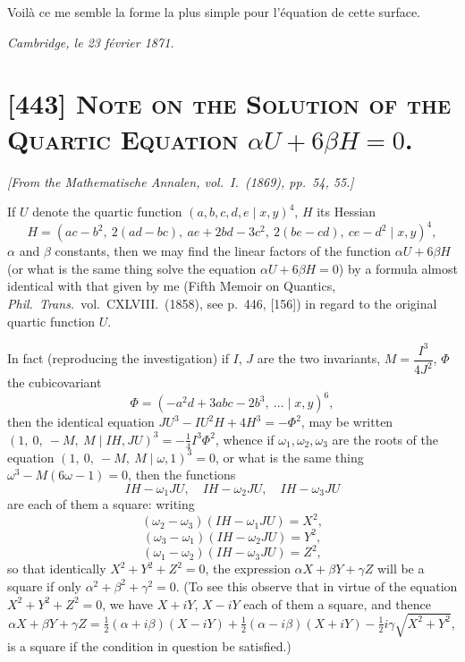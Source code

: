 \documentclass[11pt,a4paper]{article}
\begin{document}
Voil\`a ce me semble la forme la plus simple pour l'\'equation de cette surface.

\begin{flushright}
\textit{Cambridge, le 23 f\'evrier 1871.}
\end{flushright}

\bigskip

\section{[443] \textsc{Note on the Solution of the Quartic Equation} $\alpha U + 6\beta H = 0$.}

\begin{center}
\textit{[From the Mathematische Annalen, vol.\ I.\ (1869), pp.\ 54, 55.]}
\end{center}

\medskip

If $U$ denote the quartic function $(a, b, c, d, e \mid x, y)^4$, $H$ its Hessian
\[
H = (ac - b^2,\ 2(ad - bc),\ ae + 2bd - 3c^2,\ 2(be - cd),\ ce - d^2  \mid x, y)^4,
\]
$\alpha$ and $\beta$ constants, then we may find the linear factors of the function
$\alpha U + 6 \beta H$ (or what is the same thing solve the equation $\alpha U + 6 \beta H = 0$)
by a formula almost identical with that given by me (Fifth Memoir on Quantics, \textit{Phil.\
Trans.}\ vol.\ CXLVIII.\ (1858), see p.\ 446, [156]) in regard to the original quartic
function $U$.

\medskip

In fact (reproducing the investigation) if $I$, $J$ are the two invariants, $M = \dfrac{I^3}{4 J^2}$,
$\Phi$ the cubicovariant
\[
\Phi = (-a^2 d + 3 abc - 2b^3,\ \ldots  \mid x, y)^6,
\]
then the identical equation $J U^3 - I U^2 H + 4 H^3 = -\Phi^2$, may be written
$(1,\ 0,\ -M,\ M \mid IH, JU)^3 = -\tfrac{1}{4} I^3 \Phi^2$, whence if $\omega_1, \omega_2, \omega_3$
are the roots of the equation $(1,\ 0,\ -M,\ M \mid \omega, 1)^3 = 0$, or what is the same
thing $\omega^3 - M(6\omega - 1) = 0$, then the functions
\[
IH - \omega_1 JU,\quad IH - \omega_2 JU,\quad IH - \omega_3 JU
\]
are each of them a square: writing
\[
(\omega_2 - \omega_3)(IH - \omega_1 JU) = X^2,
\]
\[
(\omega_3 - \omega_1)(IH - \omega_2 JU) = Y^2,
\]
\[
(\omega_1 - \omega_2)(IH - \omega_3 JU) = Z^2,
\]
so that identically $X^2 + Y^2 + Z^2 = 0$, the expression $\alpha X + \beta Y + \gamma Z$
will be a square if only $\alpha^2 + \beta^2 + \gamma^2 = 0$. (To see this observe that in
virtue of the equation $X^2 + Y^2 + Z^2 = 0$, we have $X + iY$, $X - iY$ each of them a
square, and thence
\[
\alpha X + \beta Y + \gamma Z = \tfrac{1}{2}(\alpha + i\beta)(X - iY) + \tfrac{1}{2}(\alpha - i\beta)(X + iY) - \tfrac{1}{2} i \gamma \sqrt{X^2 + Y^2},
\]
is a square if the condition in question be satisfied.)
\end{document}
